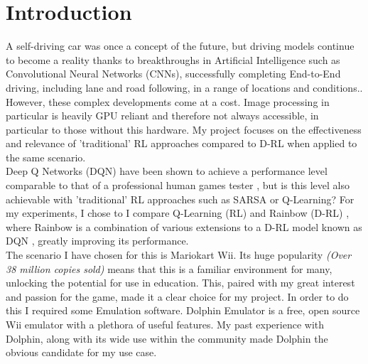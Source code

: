 \chapter*{Introduction}
A self-driving car was once a concept of the future, but driving models continue to become a reality thanks to breakthroughs in Artificial Intelligence such as Convolutional Neural Networks (CNNs), successfully completing End-to-End driving, including lane and road following, in a range of locations and conditions.\cite{DBLP:journals/corr/BojarskiTDFFGJM16}. However, these complex developments come at a cost. Image processing in particular is heavily GPU reliant and therefore not always accessible, in particular to those without this hardware. My project focuses on the effectiveness and relevance of 'traditional' RL approaches compared to D-RL when applied to the same scenario.\\
Deep Q Networks (DQN) have been shown to achieve a performance level comparable to that of a professional human games tester \cite{mnih2015human}, but is this level also achievable with 'traditional' RL approaches such as SARSA \cite{rummery1994line} or Q-Learning?\cite{watkins1992q} For my experiments, I chose to I compare Q-Learning (RL) and Rainbow (D-RL) \cite{hessel2018rainbow}, where Rainbow is a combination of various extensions to a D-RL model known as DQN \cite{mnih2013playing}, greatly improving its performance.\\
The scenario I have chosen for this is Mariokart Wii. Its huge popularity \textit{(Over 38 million copies sold)} means that this is a familiar environment for many, unlocking the potential for use in education. This, paired with my great interest and passion for the game, made it a clear choice for my project. In order to do this I required some Emulation software. Dolphin Emulator \cite{DolphinEmulator} is a free, open source Wii emulator with a plethora of useful features. My past experience with Dolphin, along with its wide use within the community made Dolphin the obvious candidate for my use case.